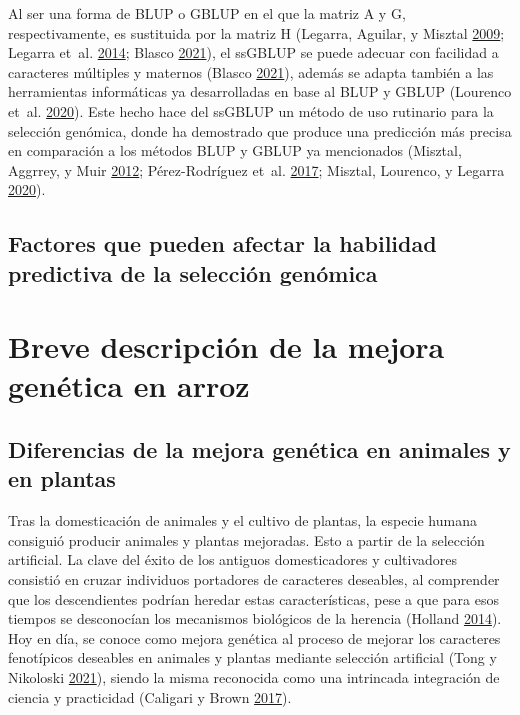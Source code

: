 \documentclass[11pt,spanish,a4paper,oneside,]{book} %
\begin{document}
Al ser una forma de BLUP o GBLUP en el que la matriz A y G, respectivamente, es sustituida por la matriz H (Legarra, Aguilar, y Misztal \protect\hyperlink{ref-cite:17}{2009}; Legarra et~al. \protect\hyperlink{ref-cite:15}{2014}; Blasco \protect\hyperlink{ref-cite:21}{2021}), el ssGBLUP se puede adecuar con facilidad a caracteres múltiples y maternos (Blasco \protect\hyperlink{ref-cite:21}{2021}), además se adapta también a las herramientas informáticas ya desarrolladas en base al BLUP y GBLUP (Lourenco et~al. \protect\hyperlink{ref-cite:22}{2020}). Este hecho hace del ssGBLUP un método de uso rutinario para la selección genómica, donde ha demostrado que produce una predicción más precisa en comparación a los métodos BLUP y GBLUP ya mencionados (Misztal, Aggrrey, y Muir \protect\hyperlink{ref-cite:14}{2012}; Pérez-Rodríguez et~al. \protect\hyperlink{ref-cite:19}{2017}; Misztal, Lourenco, y Legarra \protect\hyperlink{ref-cite:18}{2020}).

\hypertarget{factores-que-pueden-afectar-la-habilidad-predictiva-de-la-selecciuxf3n-genuxf3mica}{%
\subsection{Factores que pueden afectar la habilidad predictiva de la selección genómica}\label{factores-que-pueden-afectar-la-habilidad-predictiva-de-la-selecciuxf3n-genuxf3mica}}

\hypertarget{breve-descripciuxf3n-de-la-mejora-genuxe9tica-en-arroz}{%
\section{Breve descripción de la mejora genética en arroz}\label{breve-descripciuxf3n-de-la-mejora-genuxe9tica-en-arroz}}

\hypertarget{diferencias-de-la-mejora-genuxe9tica-en-animales-y-en-plantas}{%
\subsection{Diferencias de la mejora genética en animales y en plantas}\label{diferencias-de-la-mejora-genuxe9tica-en-animales-y-en-plantas}}

Tras la domesticación de animales y el cultivo de plantas, la especie humana consiguió producir animales y plantas mejoradas. Esto a partir de la selección artificial. La clave del éxito de los antiguos domesticadores y cultivadores consistió en cruzar individuos portadores de caracteres deseables, al comprender que los descendientes podrían heredar estas características, pese a que para esos tiempos se desconocían los mecanismos biológicos de la herencia (Holland \protect\hyperlink{ref-cite:43}{2014}). Hoy en día, se conoce como mejora genética al proceso de mejorar los caracteres fenotípicos deseables en animales y plantas mediante selección artificial (Tong y Nikoloski \protect\hyperlink{ref-cite:7}{2021}), siendo la misma reconocida como una intrincada integración de ciencia y practicidad (Caligari y Brown \protect\hyperlink{ref-cite:42}{2017}).
\end{document}
